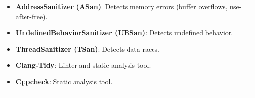 \begin{itemize}
\tightlist
\item
  \textbf{AddressSanitizer (ASan)}: Detects memory errors (buffer
  overflows, use-after-free).
\item
  \textbf{UndefinedBehaviorSanitizer (UBSan)}: Detects undefined
  behavior.
\item
  \textbf{ThreadSanitizer (TSan)}: Detects data races.
\item
  \textbf{Clang-Tidy}: Linter and static analysis tool.
\item
  \textbf{Cppcheck}: Static analysis tool.
\end{itemize}

\begin{center}\rule{0.5\linewidth}{0.5pt}\end{center}
